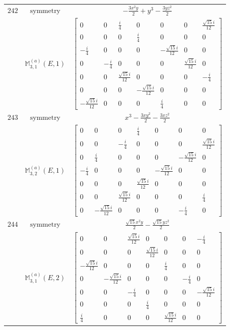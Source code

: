 \documentclass[fleqn,8pt,landscape]{jsarticle}
\begin{document}
\begin{longtable}{ccc}
$ 242 $ & $ \text{symmetry} $ & $ - \frac{3 x^{2} y}{2} + y^{3} - \frac{3 y z^{2}}{2} $ \\
$  $ & $ \mathbb{M}_{3,1}^{(a)}(E,1) $ & $ \begin{bmatrix} 0 & 0 & \frac{i}{4} & 0 & 0 & 0 & \frac{\sqrt{15} i}{12} \\ 0 & 0 & 0 & \frac{i}{4} & 0 & 0 & 0 \\ - \frac{i}{4} & 0 & 0 & 0 & - \frac{\sqrt{15} i}{12} & 0 & 0 \\ 0 & - \frac{i}{4} & 0 & 0 & 0 & \frac{\sqrt{15} i}{12} & 0 \\ 0 & 0 & \frac{\sqrt{15} i}{12} & 0 & 0 & 0 & - \frac{i}{4} \\ 0 & 0 & 0 & - \frac{\sqrt{15} i}{12} & 0 & 0 & 0 \\ - \frac{\sqrt{15} i}{12} & 0 & 0 & 0 & \frac{i}{4} & 0 & 0 \end{bmatrix} $ \\ \hline
$ 243 $ & $ \text{symmetry} $ & $ x^{3} - \frac{3 x y^{2}}{2} - \frac{3 x z^{2}}{2} $ \\
$  $ & $ \mathbb{M}_{3,2}^{(a)}(E,1) $ & $ \begin{bmatrix} 0 & 0 & 0 & \frac{i}{4} & 0 & 0 & 0 \\ 0 & 0 & - \frac{i}{4} & 0 & 0 & 0 & \frac{\sqrt{15} i}{12} \\ 0 & \frac{i}{4} & 0 & 0 & 0 & - \frac{\sqrt{15} i}{12} & 0 \\ - \frac{i}{4} & 0 & 0 & 0 & - \frac{\sqrt{15} i}{12} & 0 & 0 \\ 0 & 0 & 0 & \frac{\sqrt{15} i}{12} & 0 & 0 & 0 \\ 0 & 0 & \frac{\sqrt{15} i}{12} & 0 & 0 & 0 & \frac{i}{4} \\ 0 & - \frac{\sqrt{15} i}{12} & 0 & 0 & 0 & - \frac{i}{4} & 0 \end{bmatrix} $ \\ \hline
$ 244 $ & $ \text{symmetry} $ & $ \frac{\sqrt{15} x^{2} y}{2} - \frac{\sqrt{15} y z^{2}}{2} $ \\
$  $ & $ \mathbb{M}_{3,1}^{(a)}(E,2) $ & $ \begin{bmatrix} 0 & 0 & \frac{\sqrt{15} i}{12} & 0 & 0 & 0 & - \frac{i}{4} \\ 0 & 0 & 0 & \frac{\sqrt{15} i}{12} & 0 & 0 & 0 \\ - \frac{\sqrt{15} i}{12} & 0 & 0 & 0 & \frac{i}{4} & 0 & 0 \\ 0 & - \frac{\sqrt{15} i}{12} & 0 & 0 & 0 & - \frac{i}{4} & 0 \\ 0 & 0 & - \frac{i}{4} & 0 & 0 & 0 & - \frac{\sqrt{15} i}{12} \\ 0 & 0 & 0 & \frac{i}{4} & 0 & 0 & 0 \\ \frac{i}{4} & 0 & 0 & 0 & \frac{\sqrt{15} i}{12} & 0 & 0 \end{bmatrix} $ \\ \hline

\end{longtable}
\end{document}
